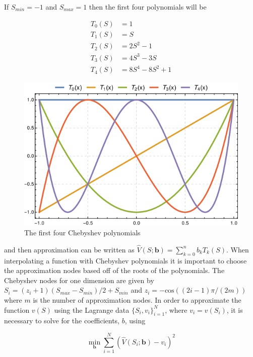 \documentclass[12pt]{article}
\begin{document}
If $S_{min}=-1$ and $S_{max}=1$ then the first four polynomials will be

\begin{equation*}
  \begin{aligned}
    T_0(S)&=1\\
    T_1(S)&=S\\
    T_2(S)&=2S^2-1\\
    T_3(S)&=4S^3-3S\\
    T_4(S)&=8S^4-8S^2+1
  \end{aligned}
\end{equation*}


\begin{figure}[H]
  \label{plot_cheb_4}
  \centering
  \includegraphics[scale=3]{plot_Chebyshev_Polynomials_of_the_First_Kind}
  \caption{The first four Chebyshev polynomials}
\end{figure}

and then approximation can be written as $\hat{V}(S;\boldsymbol{b})=\sum_{k=0}^n b_k T_k(S)$.
When interpolating a function with Chebyshev polynomials it is important to choose the approximation nodes based off of the roots of the polynomials. The Chebyshev nodes for one dimension are given by $S_i=(z_i+1)(S_{max}-S_{min})/2+S_{min}$ and $z_i=-\text{cos}((2i-1)\pi/(2m))$ where $m$ is the number of approximation nodes. In order to approximate the function $v(S)$ using the Lagrange data $\{S_i,v_i\}_{i=1}^N$, where $v_i=v(S_i)$, it is necessary to solve for the coefficients, $b$, using

\begin{equation*}
  \min_{\boldsymbol{b}}\sum_{i=1}^N (\hat{V}(S_i;\boldsymbol{b})-v_i)^2
\end{equation*}
\end{document}
